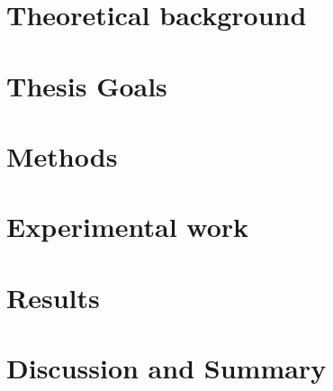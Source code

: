 \documentclass[justified,nofonts,nobib,openany]{tufte-book}
\begin{document}
\maketitle

\tableofcontents %

\chapter{Theoretical background}\label{chap:background}


\chapter{Thesis Goals}\label{chap:goals}


\chapter{Methods}\label{chap:methods}

	
\chapter{Experimental work}\label{chap:Experimental_work}


\chapter{Results}


\chapter{Discussion and Summary}\label{chap:summary}
%

\printbibliography
\end{document}
